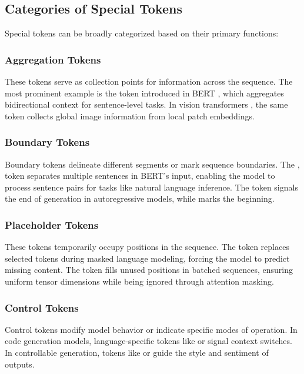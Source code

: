 \subsection{Categories of Special Tokens}

Special tokens can be broadly categorized based on their primary functions:

\subsubsection{Aggregation Tokens}
These tokens serve as collection points for information across the sequence. The most prominent example is the \cls{} token introduced in BERT \citep{devlin2018bert}, which aggregates bidirectional context for sentence-level tasks. In vision transformers \citep{dosovitskiy2020image}, the same \cls{} token collects global image information from local patch embeddings.

\subsubsection{Boundary Tokens}
Boundary tokens delineate different segments or mark sequence boundaries. The \sep{} token separates multiple sentences in BERT's input, enabling the model to process sentence pairs for tasks like natural language inference. The \eos{} token signals the end of generation in autoregressive models, while \sos{} marks the beginning.

\subsubsection{Placeholder Tokens}
These tokens temporarily occupy positions in the sequence. The \mask{} token replaces selected tokens during masked language modeling, forcing the model to predict missing content. The \pad{} token fills unused positions in batched sequences, ensuring uniform tensor dimensions while being ignored through attention masking.

\subsubsection{Control Tokens}
Control tokens modify model behavior or indicate specific modes of operation. In code generation models, language-specific tokens like  or  signal context switches. In controllable generation, tokens like  or  guide the style and sentiment of outputs.
\begin{comment}
Feedback: The "Control Tokens" section is a great place to highlight the power and flexibility of special tokens. The examples are good. You could make this even more impactful by mentioning a more advanced or surprising example, if one exists. For instance, "More advanced models use control tokens to switch between different personas, adopt a specific reasoning style (e.g., chain-of-thought), or even to query external tools and APIs." This hints at the cutting-edge applications.
\end{comment}

